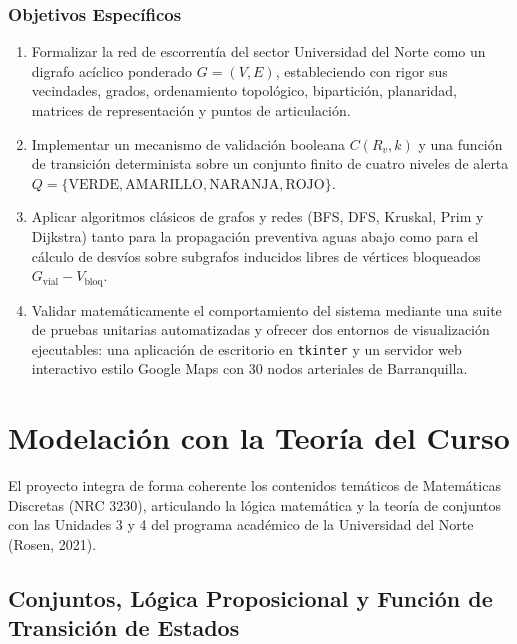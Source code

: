 \documentclass[12pt,letterpaper]{article}
\begin{document}
\subsubsection{Objetivos Específicos}
\begin{enumerate}[leftmargin=2.0cm]
    \item Formalizar la red de escorrentía del sector Universidad del Norte como un digrafo acíclico ponderado $G = (V, E)$, estableciendo con rigor sus vecindades, grados, ordenamiento topológico, bipartición, planaridad, matrices de representación y puntos de articulación.
    \item Implementar un mecanismo de validación booleana $C(R_v, k)$ y una función de transición determinista sobre un conjunto finito de cuatro niveles de alerta $Q = \{\text{VERDE}, \allowbreak \text{AMARILLO}, \allowbreak \text{NARANJA}, \allowbreak \text{ROJO}\}$.
    \item Aplicar algoritmos clásicos de grafos y redes (BFS, DFS, Kruskal, Prim y Dijkstra) tanto para la propagación preventiva aguas abajo como para el cálculo de desvíos sobre subgrafos inducidos libres de vértices bloqueados $G_{\text{vial}} - V_{\text{bloq}}$.
    \item Validar matemáticamente el comportamiento del sistema mediante una suite de pruebas unitarias automatizadas y ofrecer dos entornos de visualización ejecutables: una aplicación de escritorio en \texttt{tkinter} y un servidor web interactivo estilo Google Maps con $30$ nodos arteriales de Barranquilla.
\end{enumerate}

\section{Modelación con la Teoría del Curso}

El proyecto integra de forma coherente los contenidos temáticos de Matemáticas Discretas (NRC 3230), articulando la lógica matemática y la teoría de conjuntos con las Unidades 3 y 4 del programa académico de la Universidad del Norte (Rosen, 2021).

\subsection{Conjuntos, Lógica Proposicional y Función de Transición de Estados}
\end{document}
